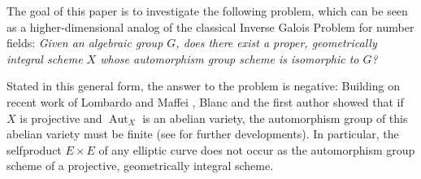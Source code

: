 \documentclass[oneside, 12pt]{amsart}
\theoremstyle{definition}
\theoremstyle{remark}
\newcommand{\CC}{\mathbb{C}}
\newcommand{\PP}{\mathbb{P}}
\newcommand{\Aut}{\operatorname{Aut}}
\renewcommand{\O}{\mathscr{O}}
\newcommand{\ra}{\rightarrow}
\begin{document}
% 
% 

The goal of this paper is to investigate the following problem, 
which can be seen as a higher-dimensional analog 
of the classical Inverse Galois Problem for number fields:
\emph{Given an algebraic group $G$, does there exist a proper, 
geometrically integral scheme $X$ whose automorphism group scheme 
is isomorphic to $G$?} 
 
Stated in this general form,  the answer to the problem is negative: 
Building on recent work of Lombardo and Maffei \cite{Lombardo; Maffei 2020}, 
Blanc and the first author \cite{Blanc; Brion 2021} showed that if $X$ is projective 
and $\Aut_X$ is an abelian variety, the automorphism group of this abelian variety 
must be finite (see \cite{Florence 2021} for further developments).
In particular, the selfproduct $E\times E$ of any elliptic curve  
does not occur as the automorphism group scheme of a projective, 
geometrically integral scheme.
  
\end{document}
